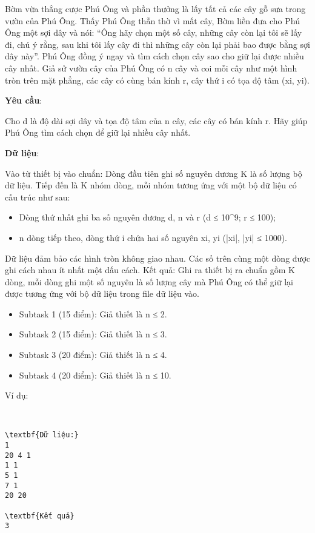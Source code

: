 

Bờm vừa thắng cược Phú Ông và phần thưởng là lấy tất cả các cây gỗ sưa trong vườn của Phú Ông. Thấy Phú Ông thẫn thờ vì mất cây, Bờm liền đưa cho Phú Ông một sợi dây và nói: “Ông hãy chọn một số cây, những cây còn lại tôi sẽ lấy đi, chú ý rằng, sau khi tôi lấy cây đi thì những cây còn lại phải bao được bằng sợi dây này”. Phú Ông đồng ý ngay và tìm cách chọn cây sao cho giữ lại được nhiều cây nhất. Giả sử vườn cây của Phú Ông có n cây và coi mỗi cây như một hình tròn trên mặt phẳng, các cây có cùng bán kính r, cây thứ i có tọa độ tâm (xi, yi).

\textbf{Yêu cầu}:

Cho d là độ dài sợi dây và tọa độ tâm của n cây, các cây có bán kính r. Hãy giúp Phú Ông tìm cách chọn để giữ lại nhiều cây nhất.

\textbf{Dữ liệu}:

Vào từ thiết bị vào chuẩn: Dòng đầu tiên ghi số nguyên dương K là số lượng bộ dữ liệu. Tiếp đến là K nhóm dòng, mỗi nhóm tương ứng với một bộ dữ liệu có cấu trúc như sau:
\begin{itemize}
	\item Dòng thứ nhất ghi ba số nguyên dương d, n và r (d ≤ 10^9; r ≤ 100);
	\item n dòng tiếp theo, dòng thứ i chứa hai số nguyên xi, yi (|xi|, |yi| ≤ 1000).
\end{itemize}

Dữ liệu đảm bảo các hình tròn không giao nhau. Các số trên cùng một dòng được ghi cách nhau ít nhất một dấu cách. Kết quả: Ghi ra thiết bị ra chuẩn gồm K dòng, mỗi dòng ghi một số nguyên là số lượng cây mà Phú Ông có thể giữ lại được tương ứng với bộ dữ liệu trong file dữ liệu vào.
\begin{itemize}
	\item Subtask 1 (15 điểm): Giả thiết là n ≤ 2.
	\item Subtask 2 (15 điểm): Giả thiết là n ≤ 3.
	\item Subtask 3 (20 điểm): Giả thiết là n ≤ 4.
	\item Subtask 4 (20 điểm): Giả thiết là n ≤ 10.
\end{itemize}Ví dụ:


​
\begin{verbatim}
\textbf{Dữ liệu:}
1
20 4 1
1 1
5 1
7 1
20 20

\textbf{Kết quả}
3\end{verbatim}

